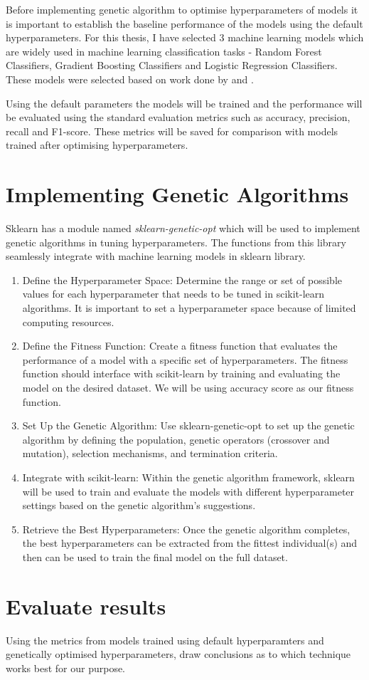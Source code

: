 Before implementing genetic algorithm to optimise hyperparameters of models it is important to establish the baseline performance of the models using the default hyperparameters. For this thesis, I have selected 3 machine learning models which are widely used in machine learning classification tasks - Random Forest Classifiers, Gradient Boosting Classifiers and Logistic Regression Classifiers. These models were selected based on work done by \cite{Wierzbiński} and \cite{Clarke2020}.

Using the default parameters the models will be trained and the performance will be evaluated using the standard evaluation metrics such as accuracy, precision, recall and F1-score. These metrics will be saved for comparison with models trained after optimising hyperparameters.

\section{Implementing Genetic Algorithms}

Sklearn has a module named \textit{sklearn-genetic-opt} which will be used to implement genetic algorithms in tuning hyperparameters. The functions from this library seamlessly integrate with machine learning models in sklearn library.

\begin{enumerate}
  \item Define the Hyperparameter Space: Determine the range or set of possible values for each hyperparameter that needs  to be tuned in scikit-learn algorithms. It is important to set a hyperparameter space because of limited computing resources.
  
  \item Define the Fitness Function: Create a fitness function that evaluates the performance of a model with a specific set of hyperparameters. The fitness function should interface with scikit-learn by training and evaluating the model on the desired dataset. We will be using accuracy score as our fitness function.
  
  \item Set Up the Genetic Algorithm: Use sklearn-genetic-opt to set up the genetic algorithm by defining the population, genetic operators (crossover and mutation), selection mechanisms, and termination criteria.
  
  \item Integrate with scikit-learn: Within the genetic algorithm framework, sklearn will be used to train and evaluate the models with different hyperparameter settings based on the genetic algorithm's suggestions.
  
  
  \item Retrieve the Best Hyperparameters: Once the genetic algorithm completes, the best hyperparameters can be extracted from the fittest individual(s) and then can be used to train the final model on the full dataset.
\end{enumerate}

\section{Evaluate results}

Using the metrics from models trained using default hyperparamters and genetically optimised hyperparameters, draw conclusions as to which technique works best for our purpose.
